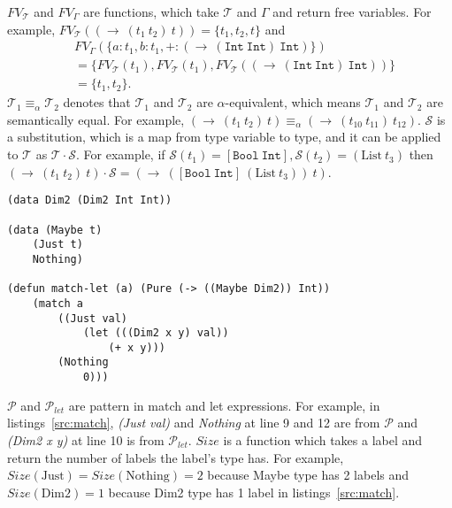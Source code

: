 \documentclass{article}
\begin{document}
$FV_\mathcal{T}$ and $FV_\Gamma$ are functions, which take $\mathcal{T}$ and $\Gamma$ and return free variables.
For example, $FV_\mathcal{T}((\rightarrow\ (t_1\ t_2)\ t)) = \{t_1, t_2, t\}$ and
\begin{equation*}
    \begin{aligned}
        &FV_\Gamma(\{a : t_1, b : t_1, + : (\rightarrow\ (\mathtt{Int}\ \mathtt{Int})\ \mathtt{Int})\}) \\
        &=\{FV_\mathcal{T}(t_1), FV_\mathcal{T}(t_1), FV_\mathcal{T}((\rightarrow\ (\mathtt{Int}\ \mathtt{Int})\ \mathtt{Int}))\} \\
        &=\{t_1, t_2\}.
    \end{aligned}
\end{equation*}
$\mathcal{T}_1 \equiv_\alpha \mathcal{T}_2$ denotes that $\mathcal{T}_1$ and $\mathcal{T}_2$ are $\alpha$-equivalent,
which means $\mathcal{T}_1$ and $\mathcal{T}_2$ are semantically equal.
For example, $(\rightarrow\ (t_1\ t_2)\ t) \equiv_\alpha (\rightarrow\ (t_{10}\ t_{11})\ t_{12})$.
$\mathcal{S}$ is a substitution, which is a map from type variable to type,
and it can be applied to $\mathcal{T}$ as $\mathcal{T} \cdot \mathcal{S}$.
For example, if $\mathcal{S}(t_1) = [\mathtt{Bool}\ \mathtt{Int}], \mathcal{S}(t_2) = (\mathrm{List}\ t_3)$ then
$(\rightarrow\ (t_1\ t_2)\ t) \cdot \mathcal{S} = (\rightarrow\ ([\mathtt{Bool}\ \mathtt{Int}]\ (\mathrm{List}\ t_3))\ t)$.

\begin{lstlisting}[caption=Example of pattern matching,label=src:match]
(data Dim2 (Dim2 Int Int))

(data (Maybe t)
    (Just t)
    Nothing)

(defun match-let (a) (Pure (-> ((Maybe Dim2)) Int))
    (match a
        ((Just val)
            (let (((Dim2 x y) val))
                (+ x y)))
        (Nothing
            0)))
\end{lstlisting}
$\mathcal{P}$ and $\mathcal{P}_{let}$ are pattern in match and let expressions.
For example, in listings~\ref{src:match}, {\it (Just val)} and {\it Nothing} at line 9 and 12 are from $\mathcal{P}$
and {\it (Dim2 x y)} at line 10 is from $\mathcal{P}_{let}$.
$Size$ is a function which takes a label and return the number of labels the label's type has.
For example, $Size(\mathrm{Just}) = Size(\mathrm{Nothing}) = 2$ because Maybe type has 2 labels
and $Size(\mathrm{Dim2}) = 1$ because Dim2 type has 1 label in listings~\ref{src:match}.
\end{document}
